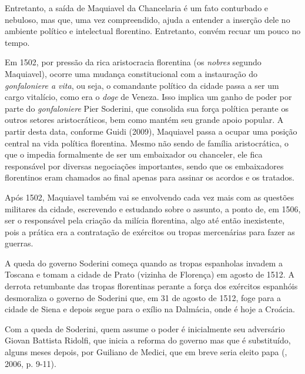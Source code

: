 Entretanto, a saída de Maquiavel da Chancelaria é um fato conturbado e
nebuloso, mas que, uma vez compreendido, ajuda a entender a inserção
dele no ambiente político e intelectual florentino. Entretanto, convém
recuar um pouco no tempo.

Em 1502, por pressão da rica aristocracia florentina (os \emph{nobres}
segundo Maquiavel), ocorre uma mudança constitucional com a instauração
do \emph{gonfaloniere a vita}, ou seja, o comandante político da cidade
passa a ser um cargo vitalício, como era o \emph{doge} de Veneza. Isso
implica um ganho de poder por parte do \emph{gonfaloniere} Pier
Soderini, que consolida sua força política perante os outros setores
aristocráticos, bem como mantém seu grande apoio popular. A partir desta
data, conforme Guidi (2009), Maquiavel passa a ocupar uma posição
central na vida política florentina. Mesmo não sendo de família
aristocrática, o que o impedia formalmente de ser um embaixador ou
chanceler, ele fica responsável por diversas negociações importantes,
sendo que os embaixadores florentinos eram chamados ao final apenas para
assinar os acordos e os tratados.

Após 1502, Maquiavel também vai se envolvendo cada vez mais com as
questões militares da cidade, escrevendo e estudando sobre o assunto, a
ponto de, em 1506, ser o responsável pela criação da milícia florentina,
algo até então inexistente, pois a prática era a contratação de
exércitos ou tropas mercenárias para fazer as guerras.

A queda do governo Soderini começa quando as tropas espanholas invadem a
Toscana e tomam a cidade de Prato (vizinha de Florença) em agosto de
1512. A derrota retumbante das tropas florentinas perante a força dos
exércitos espanhóis desmoraliza o governo de Soderini que, em 31 de
agosto de 1512, foge para a cidade de Siena e depois segue para o exílio
na Dalmácia, onde é hoje a Croácia.

Com a queda de Soderini, quem assume o poder é inicialmente seu
adversário Giovan Battista Ridolfi, que inicia a reforma do governo mas
que é substituído, alguns meses depois, por Guiliano de Medici, que em
breve seria eleito papa (, 2006, p. 9-11).


